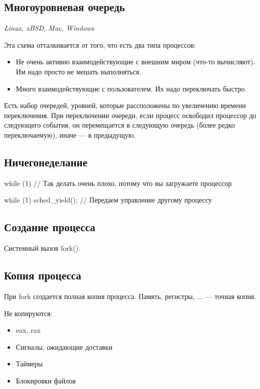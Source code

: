 \begin{multicols}{2}
    \subsection*{Многоуровневая очередь}
    \textit{Linux, xBSD, Mac, Windows}
    
    Эта схема отталкивается от того, что есть два типа процессов:
    \begin{itemize}
      \item Не очень активно взаимодействующие с внешним миром (что-то вычисляют). 
      Им надо просто не мешать выполняться. 
      \item Много взаимодействующие с пользователем. Их надо переключать быстро.
    \end{itemize}
    
    Есть набор очередей, уровней, которые рассположены по увеличению времени переключения.
    При переключении очереди, если процесс освободил процессор до следующего события, он
    перемещается в следующую очередь (более редко переключаемую), иначе --- в предыдущую.
    
    \subsection*{Ничегонеделание}
    
    while (1) {
      // Так делать очень плохо, потому что вы загружаете процессор
    }
    
    while (1) {
      sched\_yield(); // Передаем управление другому процессу
    }
    
    \subsection*{Создание процесса}
    
    Системный вызов fork().

    \subsection*{Копия процесса}
    
    При fork создается полная копия процесса. Память, регистры, ... --- точная копия.
    
    Не копируются:
    \begin{itemize}
      \item eax, rax
      \item Сигналы, ожидающие доставки
      \item Таймеры
      \item Блокировки файлов
    \end{itemize}
    

\end{multicols}
